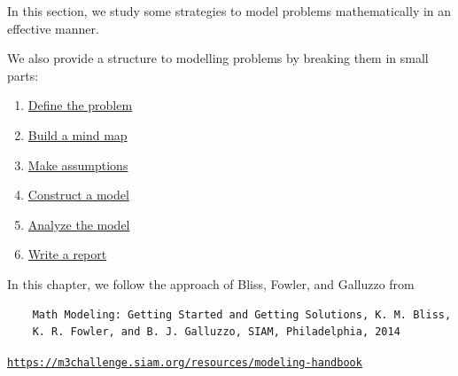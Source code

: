
%
%


\begin{topic}

\label{chap1}
In this section, we study some strategies to model problems mathematically in an effective manner.

We also provide a structure to modelling problems by breaking them in small parts:

\begin{enumerate}[label={\bf \arabic*.}]
	\item \hyperref[moddefine]{Define the problem}
	\item \hyperref[mindmap]{Build a mind map}
	\item \hyperref[assumption]{Make assumptions}
	\item \hyperref[model]{Construct a model}
	\item \hyperref[analysis]{Analyze the model}
	\item \hyperref[report]{Write a report}
\end{enumerate}

\vspace{2cm}

In this chapter, we follow the approach of Bliss, Fowler, and Galluzzo from
\begin{graybox}
\begin{minipage}{.75\textwidth}
\begin{verbatim}
	Math Modeling: Getting Started and Getting Solutions, K. M. Bliss, 
	K. R. Fowler, and B. J. Galluzzo, SIAM, Philadelphia, 2014
\end{verbatim}
\begin{center}
\href{https://m3challenge.siam.org/resources/modeling-handbook}{\tt https://m3challenge.siam.org/resources/modeling-handbook}
\end{center}
\end{minipage}
\hfill
\begin{minipage}{.20\textwidth}
	\hfill{}	
\end{minipage}
\end{graybox}


\vfill



\end{topic}
